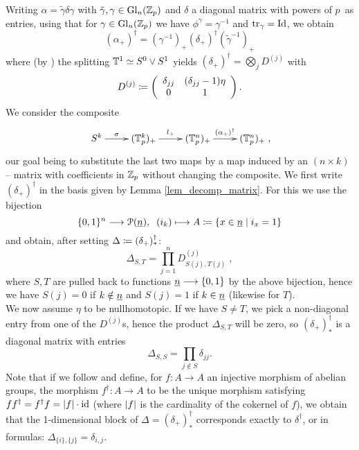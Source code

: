 \begin{rem}\label{rem_dagger_as_matrix}
Writing $\alpha = \tilde\gamma \delta \gamma$ with $\tilde\gamma,\gamma \in \operatorname{Gl}_n(\mathbb{Z}_p)$ and $\delta$ a diagonal matrix with powers of $p\,$ as entries, using that for $\gamma \in \operatorname{Gl}_n(\mathbb{Z}_p)$ we have $\phi^\gamma = \gamma^{-1}$ and $\mathrm{tr}_\gamma = \mathrm{Id}$, we obtain%
$$(\alpha_+)^\dagger = (\gamma^{-1})_+ (\delta_+)^\dagger (\tilde\gamma^{-1})_+$$
where (by \cite[Corollary 3.16]{carlsson2011higher}) the splitting $\mathbb{T}^1 \simeq S^0 \vee S^1$ yields $(\delta_+)^\dagger = \bigotimes_j D^{(j)}$ with%
\begin{equation}\label{eq_diag_dagger}D^{(j)} \defas %
\left( \begin{array}{cc}
\delta_{jj} & (\delta_{jj} - 1) \eta \\
0 & 1 \\
\end{array} \right).\end{equation}
We consider the composite%
$$\begin{xy}
\xymatrix{
  S^k \ar[r]^-{\sigma} &%
  (\sT^k_p)_+ \ar[r]^-{l_+} &%
  (\sT^n_p)_+ \ar[r]^-{(\alpha_+)^\dagger} &%
  (\sT^n_p)_+%
  }%
\end{xy},$$
our goal being to substitute the last two maps by a map induced by an $(n \times k)$ -- matrix with coefficients in $\mathbb{Z}_p$ without changing the composite. We first write $(\delta_+)^\dagger$ in the basis given by Lemma \ref{lem_decomp_matrix}. For this we use the bijection
$$\{0,1\}^n \longrightarrow \mathcal{P}(\underline{n}),\;\; (i_k) \longmapsto A \coloneqq \{ x \in \underline{n} \mid i_x = 1 \}$$%
and obtain, after setting $\Delta \coloneqq (\delta_+)^\dagger_*$:
$$ \Delta_{S,T} = \prod_{j=1}^n D^{(j)}_{S(j),T(j)}\;,$$
where $S,T$ are pulled back to functions $\underline{n} \longrightarrow \{0,1\}$ by the above bijection, hence we have $S(j) = 0$ if $k \notin \underline{n}$ and $S(j) = 1$ if $k \in \underline{n}$ (likewise for $T$).\\
We now assume $\eta$ to be nullhomotopic. If we have $S \neq T$, we pick a non-diagonal entry from one of the $D^{(j)}$s, hence the product $\Delta_{S,T}$ will be zero, so $(\delta_+)^\dagger_*$ is a diagonal matrix with entries
\begin{equation}\label{eq_dagger_of_diagnoal_plus}
	\Delta_{S,S} = \prod_{j \notin S} \delta_{jj}.
\end{equation}
Note that if we follow \cite[Def. 3.7]{carlsson2011higher} and define, for $f:A \to A$ an injective morphism of abelian groups, the morphism $f^\dagger: A \to A$ to be the unique morphism satisfying $f f^\dagger = f^\dagger f = \left\vert f\right\vert \cdot \operatorname{id}$ (where $\left\vert f\right\vert$ is the cardinality of the cokernel of $f$), we obtain that the 1-dimensional block of $\Delta = (\delta_+)^\dagger_*$ corresponds exactly to $\delta^\dagger$, or in formulas: $\Delta_{\{i\},\{j\}} = \delta_{i,j}$.\\

\end{rem}
